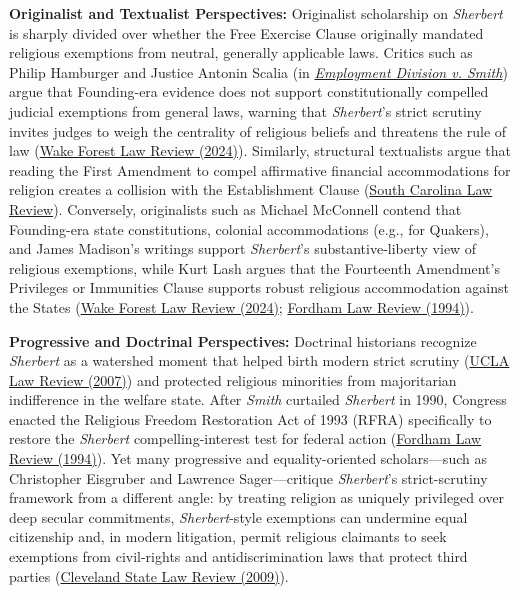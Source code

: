 \documentclass[12pt]{article}
\begin{document}
\textbf{Originalist and Textualist Perspectives:} Originalist scholarship on \textit{Sherbert} is sharply divided over whether the Free Exercise Clause originally mandated religious exemptions from neutral, generally applicable laws. Critics such as Philip Hamburger and Justice Antonin Scalia (in \href{https://fedsoc.org/case/employment-division-v-smith}{\textit{Employment Division v. Smith}}) argue that Founding-era evidence does not support constitutionally compelled judicial exemptions from general laws, warning that \textit{Sherbert}'s strict scrutiny invites judges to weigh the centrality of religious beliefs and threatens the rule of law (\href{https://www.wakeforestlawreview.com/wp-content/uploads/2024/07/w05_Lingo.pdf}{Wake Forest Law Review (2024)}). Similarly, structural textualists argue that reading the First Amendment to compel affirmative financial accommodations for religion creates a collision with the Establishment Clause (\href{https://sclawreview.org/article/the-single-religion-clause-non-established-free-and-independent-exercise/}{South Carolina Law Review}). Conversely, originalists such as Michael McConnell contend that Founding-era state constitutions, colonial accommodations (e.g., for Quakers), and James Madison's writings support \textit{Sherbert}'s substantive-liberty view of religious exemptions, while Kurt Lash argues that the Fourteenth Amendment's Privileges or Immunities Clause supports robust religious accommodation against the States (\href{https://www.wakeforestlawreview.com/wp-content/uploads/2024/07/w05_Lingo.pdf}{Wake Forest Law Review (2024)}; \href{https://ir.lawnet.fordham.edu/cgi/viewcontent.cgi?article=3071&context=flr}{Fordham Law Review (1994)}).

\textbf{Progressive and Doctrinal Perspectives:} Doctrinal historians recognize \textit{Sherbert} as a watershed moment that helped birth modern strict scrutiny (\href{https://www.uclalawreview.org/wp-content/uploads/2019/09/33_54UCLALRev1267June2007.pdf}{UCLA Law Review (2007)}) and protected religious minorities from majoritarian indifference in the welfare state. After \textit{Smith} curtailed \textit{Sherbert} in 1990, Congress enacted the Religious Freedom Restoration Act of 1993 (RFRA) specifically to restore the \textit{Sherbert} compelling-interest test for federal action (\href{https://ir.lawnet.fordham.edu/cgi/viewcontent.cgi?article=3071&context=flr}{Fordham Law Review (1994)}). Yet many progressive and equality-oriented scholars---such as Christopher Eisgruber and Lawrence Sager---critique \textit{Sherbert}'s strict-scrutiny framework from a different angle: by treating religion as uniquely privileged over deep secular commitments, \textit{Sherbert}-style exemptions can undermine equal citizenship and, in modern litigation, permit religious claimants to seek exemptions from civil-rights and antidiscrimination laws that protect third parties (\href{https://engagedscholarship.csuohio.edu/cgi/viewcontent.cgi?article=1116&context=clevstlrev}{Cleveland State Law Review (2009)}).
\end{document}
